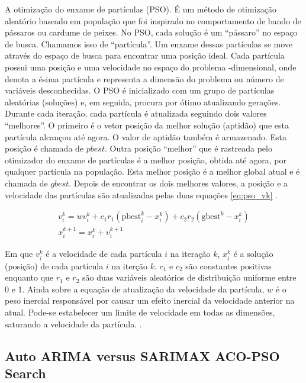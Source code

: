 A otimização do enxame de partículas (PSO). É um método de otimização aleatório baseado em população que foi inspirado no comportamento de bando de pássaros ou cardume de peixes. No PSO, cada solução é um “pássaro” no espaço de busca. Chamamos isso de “partícula”. Um enxame dessas partículas se move através do espaço de busca para encontrar uma posição ideal. Cada partícula possui uma posição e uma velocidade no espaço do problema -dimensional, onde denota a ésima partícula e representa a dimensão do problema ou número de variáveis desconhecidas. O PSO é inicializado com um grupo de partículas aleatórias (soluções) e, em seguida, procura por ótimo atualizando gerações. Durante cada iteração, cada partícula é atualizada seguindo dois valores “melhores”. O primeiro é o vetor posição da melhor solução (aptidão) que esta partícula alcançou até agora. O valor de aptidão também é armazenado. Esta posição é chamada de $pbest$. Outra posição “melhor” que é rastreada pelo otimizador do enxame de partículas é a melhor posição, obtida até agora, por qualquer partícula na população. Esta melhor posição é a melhor global atual e é chamada de $gbest$. Depois de encontrar os dois melhores valores, a posição e a velocidade das partículas são atualizadas pelas duas equações \ref{eq:pso_vk} \cite{jaberipour2011particle}.

\begin{equation}
\label{eq:pso_vk}
    \begin{gathered}
        v_i^k=wv_i^k+c_1r_1{(\mathrm{pbest}_i^k-x_i^k)}+c_2r_2{(\mathrm{gbest}^k-x_i^k)} \\
        x_i^{k+1}=x_i^k+v_i^{k+1}
    \end{gathered}
\end{equation}

Em que $v_i^k$ é a velocidade de cada partícula $i$ na iteração $k$, $x_i^{k}$ é a solução (posição) de cada partícula $i$ na iterção $k$. $c_1$ e $c_2$ são constantes positivas enquanto que $r_1$ e $r_2$ são duas variáveis aleatórios de distribuição uniforme entre 0 e 1. Ainda sobre a equação de atualização da velocidade da partícula,  $w$ é o peso inercial responsável por causar um efeito inercial da velocidade anterior na atual. Pode-se estabelecer um limite de velocidade em todas as dimensões, saturando a velocidade da partícula. \cite{jaberipour2011particle}.

\subsection{Auto ARIMA versus SARIMAX ACO-PSO Search}


